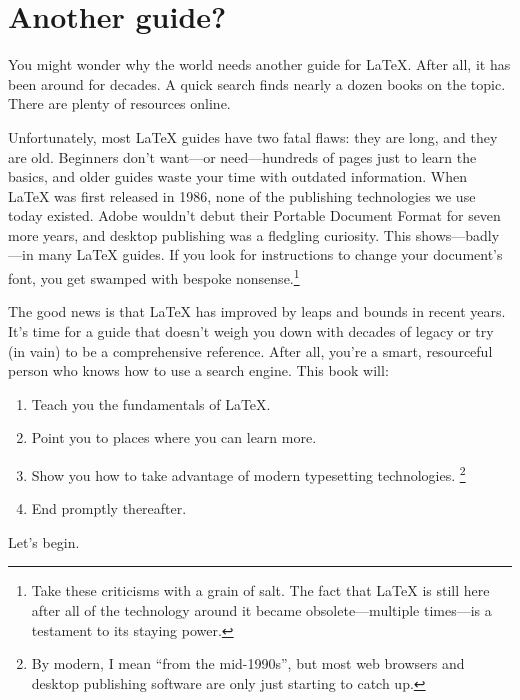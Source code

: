 \section{Another guide?}

You might wonder why the world needs another guide for \LaTeX{}.
After all, it has been around for decades.
A quick search finds nearly a dozen books on the topic.
There are plenty of resources online.

Unfortunately, most \LaTeX{} guides have two fatal flaws:
they are long, and they are old.
Beginners don't want---or need---hundreds of pages just to learn the basics,
and older guides waste your time with outdated information.
When \LaTeX{} was first released in 1986, none of the publishing technologies
we use today existed.
Adobe wouldn't debut their Portable Document Format for seven more years,
and desktop publishing was a fledgling curiosity.
This shows---badly---in many \LaTeX{} guides.
If you look for instructions to change your document's font,
you get swamped with bespoke nonsense.\punckern\footnote{%
Take these criticisms with a grain of
salt. The fact that \LaTeX{} is still here after all of the technology around it became
obsolete---multiple times---is a testament to its staying power.}
\clearpage

The good news is that  \LaTeX{} has improved by leaps and bounds in recent years.
It's time for a guide that doesn't weigh you down with decades of legacy
or try (in vain) to be a comprehensive reference.
After all, you're a smart, resourceful person who knows how to use a
search engine.
This book will:

\begin{enumerate}
\item Teach you the fundamentals of \LaTeX.
\item Point you to places where you can learn more.
\item Show you how to take advantage of modern typesetting technologies.%
    \footnote{By modern, I mean ``from the mid-1990s''\quotekern,
    but most web browsers and desktop publishing software are only just starting
    to catch up.}
\item End promptly thereafter.
\end{enumerate}
\vspace{\baselineskip}

\noindent Let's begin.
